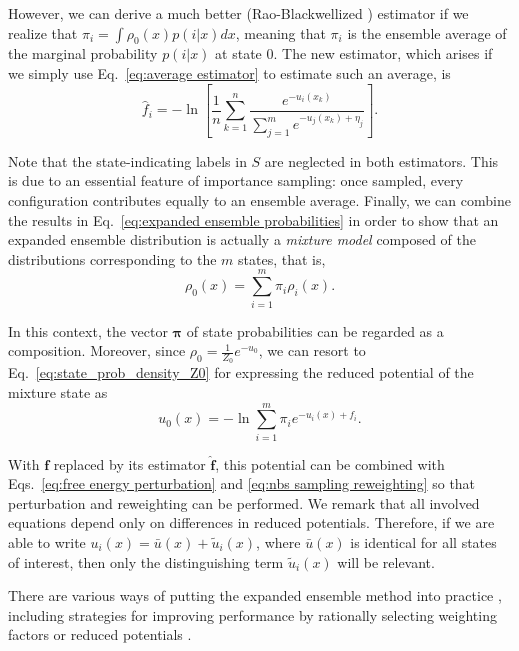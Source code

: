 \documentclass[
    journal=jctcce,
    layout=twocolumn
]{achemso}
\newcommand{\vt}[1]{\boldsymbol{\mathbf{#1}}}   %
\begin{document}
However, we can derive a much better (Rao-Blackwellized \cite{Carlson_2016, Ding_2017}) estimator if we realize that $\pi_i = \int \rho_0(x) p(i|x) dx$, meaning that $\pi_i$ is the ensemble average of the marginal probability $p(i|x)$ at state $0$. The new estimator, which arises if we simply use Eq.~\eqref{eq:average estimator} to estimate such an average, is
\begin{equation}
\label{eq:expanded ensemble FEP estimator}
\hat f_i = -\ln \left[ \frac{1}{n}\sum_{k=1}^n \frac{e^{-u_i(x_k)}}{\sum_{j=1}^m e^{-u_j(x_k) + \eta_j}} \right].
\end{equation}

Note that the state-indicating labels in $S$ are neglected in both estimators. This is due to an essential feature of importance sampling: once sampled, every configuration contributes equally to an ensemble average. Finally, we can combine the results in Eq.~\eqref{eq:expanded ensemble probabilities} in order to show that an expanded ensemble distribution is actually a \textit{mixture model} \cite{Lindsay_1995, Marin_2005} composed of the distributions corresponding to the $m$ states, that is,
\begin{equation}
\label{eq:mixture ensemble}
\rho_0(x) = \sum_{i=1}^m \pi_i \rho_i(x).
\end{equation}

In this context, the vector $\vt \pi$ of state probabilities can be regarded as a composition. Moreover, since $\rho_0 = \frac{1}{Z_0}e^{-u_0}$, we can resort to Eq.~\eqref{eq:state_prob_density_Z0} for expressing the reduced potential of the mixture state as
\begin{equation}
\label{eq:mixture potential}
u_0(x) = -\ln \sum_{i=1}^m \pi_i e^{-u_i(x) + f_i}.
\end{equation}

With $\vt f$ replaced by its estimator $\hat{\vt f}$, this potential can be combined with Eqs.~\eqref{eq:free energy perturbation} and \eqref{eq:nbs sampling reweighting} so that perturbation and reweighting can be performed. We remark that all involved equations depend only on differences in reduced potentials. Therefore, if we are able to write $u_i(x) = {\bar u}(x) + \tilde{u}_i(x)$, where $\bar u(x)$ is identical for all states of interest, then only the distinguishing term $\tilde u_i(x)$ will be relevant.

There are various ways of putting the expanded ensemble method into practice \cite{Lyubartsev_1992, Nymeyer_2010, Katzgraber_2006, *Trebst_2006, Escobedo_2007, *Escobedo_2008, *Martinez-veracoechea_2008, Chodera_2011_2}, including strategies for improving performance by rationally selecting weighting factors or reduced potentials \cite{Katzgraber_2006, *Trebst_2006, Escobedo_2007, *Escobedo_2008, *Martinez-veracoechea_2008}.
\end{document}
